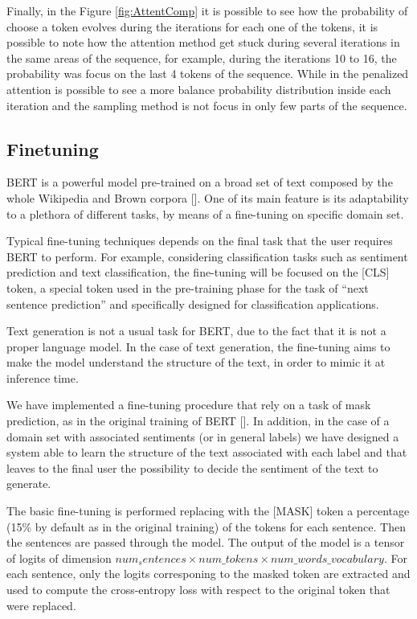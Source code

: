 \documentclass[10pt,twocolumn,letterpaper]{article}
\begin{document}
Finally, in the Figure \ref{fig:AttentComp} it is possible to see how the probability of choose a token evolves
during the iterations for each one of the tokens, it is possible to note how the attention method
get stuck during several iterations in the same areas of the sequence, for example, during the iterations
10 to 16, the probability was focus on the last 4 tokens of the sequence.
While in the penalized attention is possible to see a more balance probability distribution inside each iteration
and the sampling method is not focus in only few parts of the sequence.

\subsection{Finetuning}
BERT is a powerful model pre-trained on a broad set of text composed by the whole
Wikipedia and Brown corpora [].
One of its main feature is its adaptability to a plethora of different tasks,
by means of a fine-tuning on specific domain set.

Typical fine-tuning techniques depends on the final task that the user requires BERT to perform.
For example, considering classification tasks such as sentiment prediction and text classification,
the fine-tuning will be focused on the [CLS] token, a special token used in the pre-training phase for the task
of “next sentence prediction” and specifically designed for classification applications.

Text generation is not a usual task for BERT, due to the fact that it is not a proper language model.
In the case of text generation, the fine-tuning aims to make the model understand the structure of the text,
in order to mimic it at inference time.

We have implemented a fine-tuning procedure that rely on a task of mask prediction, as in the original training of BERT [].
In addition, in the case of a domain set with associated sentiments (or in general labels) we have designed
a system able to learn the structure of the text associated with each label and that leaves to the final user
the possibility to decide the sentiment of the text to generate.

The basic fine-tuning is performed replacing with the [MASK] token a percentage (15\% by default as in the original
training) of the tokens for each sentence.
Then the sentences are passed through the model.
The output of the model is a tensor of logits of dimension $num_sentences \times num\_tokens \times num\_words\_vocabulary$.
For each sentence, only the logits corresponing to the masked token are extracted and used to compute the cross-entropy
loss with respect to the original token that were replaced.
\end{document}
